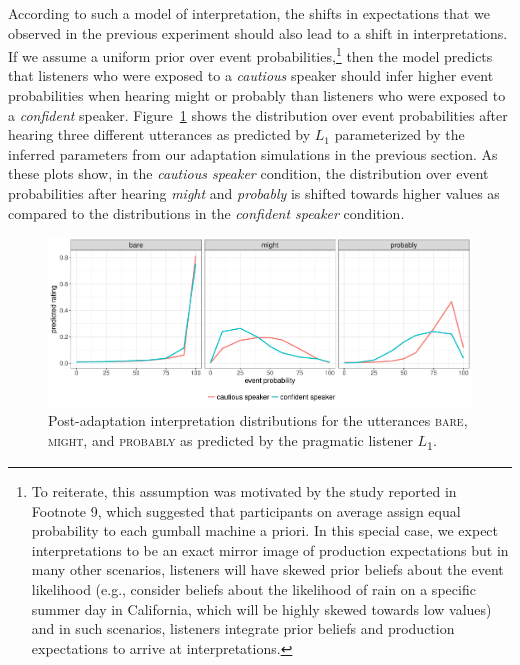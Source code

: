 According to such a model of interpretation, the shifts in expectations that we observed in the previous experiment should also lead to a shift in interpretations. 
If we assume a uniform prior over event probabilities,\footnote{To reiterate, this assumption was motivated by the study reported in Footnote 9, which suggested that participants on average assign equal probability to each gumball machine a priori. In this special case, we expect interpretations to be an exact mirror image of production expectations but in many other scenarios, listeners will have skewed prior beliefs about the event likelihood (e.g., consider beliefs about the likelihood of rain on a specific summer day in California, which will be highly skewed towards low values) and in such scenarios, listeners integrate prior beliefs and  production expectations to arrive at interpretations.} then the model predicts that listeners who were exposed to a \textit{cautious} speaker should infer 
higher event probabilities when hearing {\sc might} or {\sc probably} than listeners who were exposed to a \textit{confident} speaker. Figure~\ref{fig:post-exposure-comp}
shows the distribution over event probabilities after hearing three different utterances as predicted by $L_1$ parameterized by the inferred parameters from our
adaptation simulations in the previous section. As these plots show, in the \textit{cautious speaker} condition, the distribution over event probabilities after hearing \textit{might} 
and \textit{probably} is shifted towards higher values as compared to the distributions in the \textit{confident speaker} condition. 

\begin{figure}
  \includegraphics[width=\textwidth]{plots/fig-13-adaptation-posterior-comp.pdf}
  \caption{Post-adaptation interpretation distributions for the utterances  \textsc{bare}, \textsc{might}, and \textsc{probably} as predicted by the pragmatic listener $L$\textsubscript{$1$}. \label{fig:post-exposure-comp}}
\end{figure}

